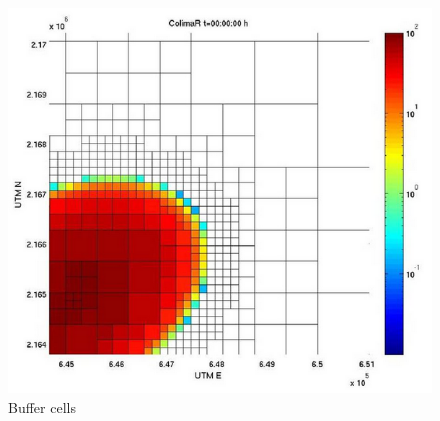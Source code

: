 \documentclass[letterpaper,10pt]{article}
\begin{document}
\begin{figure}[!h]
	\begin{center}
		\includegraphics[scale=.3]{IMAGES/buffercells.png}
		\caption{Buffer cells}
		\label{bufcell}
	\end{center}
\end{figure} 
\end{document}
